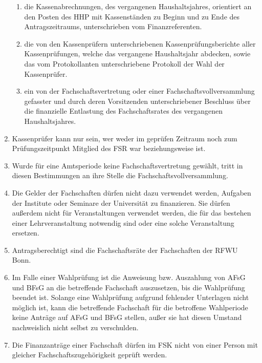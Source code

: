 \documentclass{article}
\begin{document}
\begin{enumerate}[(1)]
\begin{enumerate}[1.]
        \item die Kassenabrechnungen, des vergangenen Haushaltsjahres, orientiert an den Posten des HHP mit Kassenständen zu Beginn und zu Ende des Antragszeitraums, unterschrieben vom Finanzreferenten.
        \item die von den Kassenprüfern unterschriebenen Kassenprüfungsberichte aller Kassenprüfungen, welche das vergangene Haushaltsjahr abdecken, sowie das vom Protokollanten unterschriebene Protokoll der Wahl der Kassenprüfer.
        \item ein von der Fachschaftsvertretung oder einer Fachschaftsvollversammlung gefasster und durch deren Vorsitzenden unterschriebener Beschluss über die finanzielle  Entlastung des Fachschaftsrates des vergangenen Haushaltsjahres.
    \end{enumerate}
    \item Kassenprüfer kann nur sein, wer weder im geprüfen Zeitraum noch zum Prüfungszeitpunkt Mitglied des FSR war beziehungsweise ist.
    \item Wurde für eine Amtsperiode keine Fachschaftsvertretung gewählt, tritt in diesen Bestimmungen an ihre Stelle die Fachschaftsvollversammlung.
    \item Die Gelder der Fachschaften dürfen nicht dazu verwendet werden, Aufgaben der Institute oder Seminare der Universität zu finanzieren. 
    	Sie dürfen außerdem nicht für Veranstaltungen verwendet werden, die für das bestehen einer Lehrveranstaltung notwendig sind oder eine solche Veranstaltung ersetzen.
    \item Antragsberechtigt sind die Fachschaftsräte der Fachschaften der RFWU Bonn.
    \item Im Falle einer Wahlprüfung ist die Anweisung bzw. Auszahlung von AFsG und BFsG an die betreffende Fachschaft auszusetzen, bis die Wahlprüfung beendet ist. 
    	Solange eine Wahlprüfung aufgrund fehlender Unterlagen nicht möglich ist, kann die betreffende Fachschaft für die betroffene Wahlperiode keine Anträge auf AFsG und BFsG stellen, außer sie hat diesen Umstand nachweislich nicht selbst zu verschulden.
    \item Die Finanzanträge einer Fachschaft dürfen im FSK nicht von einer Person mit gleicher Fachschaftszugehörigkeit geprüft werden.

\end{enumerate}
\end{document}
